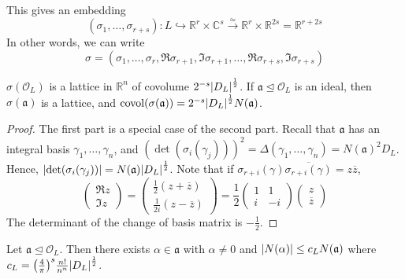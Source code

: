 This gives an embedding
\[ (\sigma_1, \dots, \sigma_{r+s}) \colon L \hookrightarrow \mathbb R^r \times \mathbb C^s \xrightarrow{\simeq} \mathbb R^r \times \mathbb R^{2s} = \mathbb R^{r+2s} \]
In other words, we can write
\[ \sigma = (\sigma_1, \dots, \sigma_r, \Re \sigma_{r+1}, \Im \sigma_{r+1}, \dots, \Re\sigma_{r+s}, \Im\sigma_{r+s}) \]
\begin{lemma}
    \( \sigma(\mathcal O_L) \) is a lattice in \( \mathbb R^n \) of covolume \( 2^{-s} \abs{D_L}^{\frac{1}{2}} \).
    If \( \mathfrak a \trianglelefteq \mathcal O_L \) is an ideal, then \( \sigma(\mathfrak a) \) is a lattice, and \( \operatorname{covol}(\sigma(\mathfrak a)) = 2^{-s} \abs{D_L}^{\frac{1}{2}} N(\mathfrak a) \).
\end{lemma}
\begin{proof}
    The first part is a special case of the second part.
    Recall that \( \mathfrak a \) has an integral basis \( \gamma_1, \dots, \gamma_n \), and \( (\det (\sigma_i(\gamma_j)))^2 = \Delta(\gamma_1, \dots, \gamma_n) = N(\mathfrak a)^2 D_L \).
    Hence, \( \abs{\det(\sigma_i(\gamma_j))} = N(\mathfrak a) \abs{D_L}^{\frac{1}{2}} \).
    Note that if \( \sigma_{r+i}(\gamma) \overline{\sigma_{r+i}(\gamma)} = z\overline z \),
    \[ \begin{pmatrix}
        \Re z \\
        \Im z
    \end{pmatrix} = \begin{pmatrix}
        \frac{1}{2}(z + \overline z) \\
        \frac{1}{2i}(z - \overline z)
    \end{pmatrix} = \frac{1}{2}\begin{pmatrix}
        1 & 1 \\
        i & -i
    \end{pmatrix} \begin{pmatrix}
        z \\ \overline z
    \end{pmatrix} \]
    The determinant of the change of basis matrix is \( -\frac{1}{2} \).
\end{proof}
\begin{proposition}
    Let \( \mathfrak a \trianglelefteq \mathcal O_L \).
    Then there exists \( \alpha \in \mathfrak a \) with \( \alpha \neq 0 \) and \( \abs{N(\alpha)} \leq c_L N(\mathfrak a) \) where \( c_L = \qty(\frac{4}{\pi})^s \frac{n!}{n^n} \abs{D_L}^{\frac{1}{2}} \).
\end{proposition}
